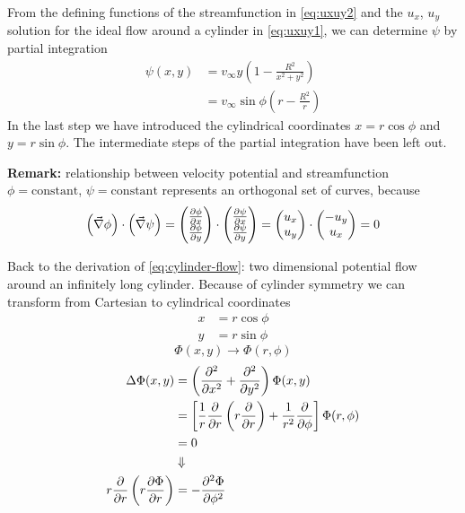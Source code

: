 From the defining functions of the streamfunction in \eqref{eq:uxuy2} and the $u_x$, $u_y$ solution for the ideal flow around a cylinder in \eqref{eq:uxuy1}, we can determine $\psi$ by partial integration
\begin{align}
\psi(x,y) &= v_\infty y\left(1-\frac{R^2}{x^2+y^2}\right)\\
&= v_\infty \sin\phi\left(r-\frac{R^2}{r}\right)
\end{align}
In the last step we have introduced the cylindrical coordinates $x=r\cos\phi$ and $y = r\sin\phi$. The intermediate steps of the partial integration have been left out.
\begin{framed}
\textbf{Remark:} relationship between velocity potential and streamfunction\newline $\phi=\mathrm{constant}$, $\psi=\mathrm{constant}$ represents an orthogonal set of curves, because
\begin{equation}
\left(\vec{\nabla}\phi\right)\cdot\left(\vec{\nabla}\psi\right) = 
\begin{pmatrix}
\frac{\partial \phi}{\partial x} \\ \frac{\partial \phi}{\partial y}
\end{pmatrix} \cdot
\begin{pmatrix}
\frac{\partial \psi}{\partial x} \\ \frac{\partial \psi}{\partial y}
\end{pmatrix} = 
\begin{pmatrix}
u_x \\ u_y
\end{pmatrix}\cdot
\begin{pmatrix}
-u_y \\ u_x
\end{pmatrix} = 0
\end{equation}
\end{framed}
Back to the derivation of \eqref{eq:cylinder-flow}: two dimensional potential flow around an infinitely long cylinder. Because of cylinder symmetry we can transform from Cartesian to cylindrical coordinates
\begin{align}
x &= r\cos\phi\\
y &= r\sin\phi
\end{align}
\begin{equation}
\Phi(x,y) \rightarrow \Phi(r,\phi)
\end{equation}
\begin{align}
\Delta\Phi(x,y) &= \left(\frac{\partial^2 }{\partial x^2}+\frac{\partial^2 }{\partial y^2}\right)\Phi(x,y) \\
&= \left[\frac{1}{r}\frac{\partial }{\partial r}\left(r\frac{\partial }{\partial r}\right) + \frac{1}{r^2}\frac{\partial }{\partial \phi}\right]\Phi(r,\phi)\\
&= 0\\
&\Downarrow\notag\\
r\frac{\partial }{\partial r}\left(r\frac{\partial \Phi}{\partial r}\right) &= -\frac{\partial^2 \Phi}{\partial \phi^2}
\end{align}
